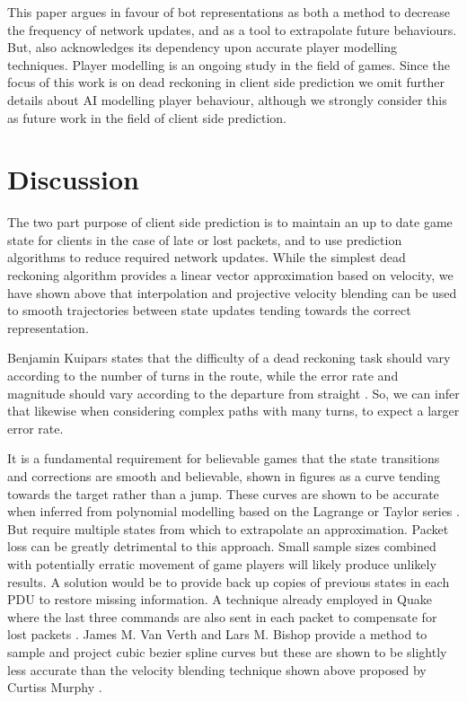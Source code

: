 \documentclass[journal]{IEEEtran}
\begin{document}
This paper argues in favour of bot representations as both a method to decrease the frequency of network updates, and as a tool to extrapolate future behaviours. But, also acknowledges its dependency upon accurate player modelling techniques. Player modelling is an ongoing study in the field of games. Since the focus of this work is on dead reckoning in client side prediction we omit further details about AI modelling player behaviour, although we strongly consider this as future work in the field of client side prediction.

\section{Discussion}

The two part purpose of client side prediction is to maintain an up to date game state for clients in the case of late or lost packets, and to use prediction algorithms to reduce required network updates. While the simplest dead reckoning algorithm provides a linear vector approximation based on velocity, we have shown above that interpolation and projective velocity blending can be used to smooth trajectories between state updates tending towards the correct representation.

Benjamin Kuipars states that the difficulty of a dead reckoning task should vary according to the number of turns in the route, while the error rate and magnitude should vary according to the departure from straight \cite{kuipers1978modeling}. So, we can infer that likewise when considering complex paths with many turns, to expect a larger error rate.

It is a fundamental requirement for believable games that the state transitions and corrections are smooth and believable, shown in figures as a curve tending towards the target rather than a jump. These curves are shown to be accurate when inferred from polynomial modelling based on the Lagrange or Taylor series \cite{hanawa2006proposal}. But require multiple states from which to extrapolate an approximation. Packet loss can be greatly detrimental to this approach. Small sample sizes combined with potentially erratic movement of game players will likely produce unlikely results. A solution would be to provide back up copies of previous states in each PDU to restore missing information. A technique already employed in Quake where the last three commands are also sent in each packet to compensate for lost packets \cite{cronin2001distributed}. James M. Van Verth and Lars M. Bishop provide a method to sample and project cubic bezier spline curves \cite{van2008essential} but these are shown to be slightly less accurate than the velocity blending technique shown above proposed by Curtiss Murphy \cite{murphy2011believable}. 
\end{document}

